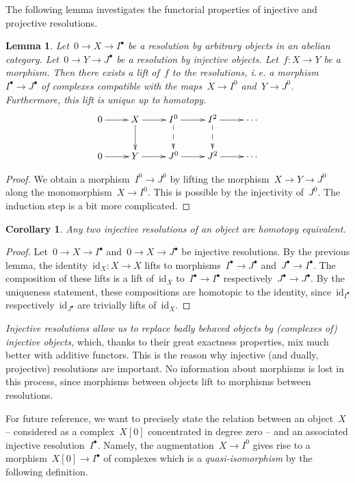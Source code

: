 \documentclass{amsart}
\makeatletter
\theoremstyle{definition}
\theoremstyle{plain}
\newtheorem{cor}[defn]{Corollary}
\newtheorem{lemma}[defn]{Lemma}
\theoremstyle{remark}
\newcommand{\id}{\mathrm{id}}
\newcommand{\?}{\,{:}\,}
\renewcommand{\_}{\mathpunct{.}\,}
\newcommand{\ie}{i.\,e.\@\xspace}
\makeatother
\begin{document}
The following lemma investigates the functorial properties of injective and
projective resolutions.

\begin{lemma}\label{lemma:inj-funct}Let~$0 \to X \to I^\bullet$ be a resolution
by arbitrary objects in an abelian category. Let~$0 \to Y \to J^\bullet$ be a
resolution by injective objects. Let~$f : X \to Y$ be a morphism. Then there
exists a lift of~$f$ to the resolutions, \ie a morphism~$I^\bullet \to
J^\bullet$ of complexes compatible with the maps~$X \to I^0$ and~$Y \to J^0$.
Furthermore, this lift is unique up to homotopy.
\[ \xymatrix{
  0 \ar[r] & X \ar[r]\ar[d] & I^0 \ar[r]\ar@{-->}[d] & I^2 \ar[r]\ar@{-->}[d] & \cdots \\
  0 \ar[r] & Y \ar[r] & J^0 \ar[r] & J^2 \ar[r] & \cdots
} \]
\end{lemma}
\begin{proof}We obtain a morphism~$I^0 \to J^0$ by lifting the morphism~$X \to
Y \to J^0$ along the monomorphism~$X \to I^0$. This is possible by the
injectivity of~$J^0$. The induction step is a bit more complicated.
\end{proof}

\begin{cor}\label{cor:inj-he}Any two injective resolutions of an object are
homotopy equivalent.\end{cor}
\begin{proof}Let~$0 \to X \to I^\bullet$ and~$0 \to X \to J^\bullet$ be
injective resolutions. By the previous lemma, the identity~$\id_X : X \to X$ lifts to
morphisms~$I^\bullet \to J^\bullet$ and~$J^\bullet \to I^\bullet$. The
composition of these lifts is a lift of~$\id_X$ to~$I^\bullet \to I^\bullet$
respectively~$J^\bullet \to J^\bullet$. By the uniqueness statement, these
compositions are homotopic to the identity, since~$\id_{I^\bullet}$
respectively~$\id_{J^\bullet}$ are trivially lifts of~$\id_X$.\end{proof}

\emph{Injective resolutions allow us to replace badly behaved
objects by (complexes of) injective objects,} which, thanks to their great
exactness properties, mix much better with additive functors. This is the
reason why injective (and dually, projective) resolutions are important. No
information about morphisms is lost in this process, since morphisms between
objects lift to morphisms between resolutions.

For future reference, we want to precisely state the relation between an
object~$X$ -- considered as a complex~$X[0]$ concentrated in degree zero -- and
an associated injective resolution~$I^\bullet$. Namely, the augmentation~$X \to
I^0$ gives rise to a morphism~$X[0] \to I^\bullet$ of complexes which is
a \emph{quasi-isomorphism} by the following definition.
\end{document}
